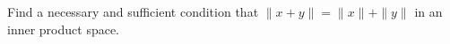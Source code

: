 Find a necessary and sufficient condition that $\|x + y\| = \|x\| + \|y\|$ in an inner product space.
